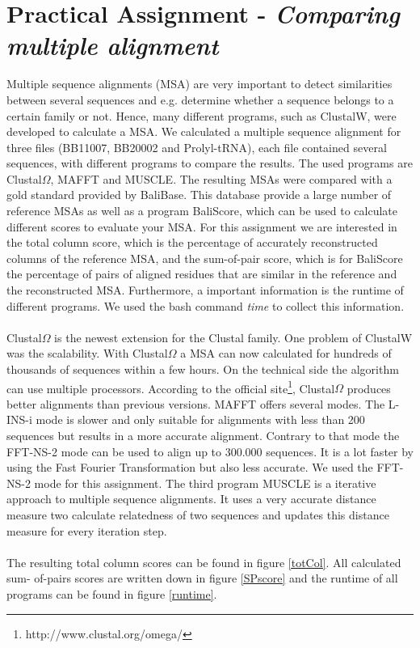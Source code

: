 \documentclass[%
   10pt,              %
   nenglish,           %
   a4paper,           %
   DIV11,             %
]{scrartcl}%
\begin{document}
\section*{Practical Assignment - \textsl{Comparing multiple alignment}}
Multiple sequence alignments (MSA) are very important to detect similarities between several 
sequences and e.g. determine whether a sequence belongs to a certain family or not. Hence, many 
different programs, such as ClustalW, were developed to calculate a MSA. We calculated a multiple 
sequence alignment for three files (BB11007, BB20002 and Prolyl-tRNA), each file contained several 
sequences, with different programs 
to compare the results. The used programs are Clustal$\Omega$\cite{Sievers539}, MAFFT\cite{Katoh1} 
and MUSCLE\cite{Edgar1, Edgar2}. The resulting MSAs were compared with a gold standard provided by 
BaliBase\cite{Bahr1}. This database provide a large number of reference MSAs as well as a program 
\grqq BaliScore\grqq , which can be used to calculate different scores to evaluate your MSA. For 
this assignment we are interested in the total column score, which is the percentage of accurately 
reconstructed columns of the reference MSA, and the sum-of-pair score, which is for BaliScore the 
percentage of pairs of aligned residues that are similar in the reference and the reconstructed 
MSA. Furthermore, a important information is the runtime of different programs. We used the bash 
command \textit{time} to collect this information.\\
\\
\noindent Clustal$\Omega$ is the newest extension for the Clustal family. One problem of ClustalW 
was the scalability. With Clustal$\Omega$ a MSA can now calculated for hundreds of thousands of 
sequences within a few hours. On the technical side the algorithm can use multiple processors. 
According to the official site\footnote{http://www.clustal.org/omega/}, Clustal$\Omega$ produces 
better alignments than previous versions. MAFFT offers several modes. The L-INS-i mode is 
slower and only suitable for alignments with less than 200 sequences but results in a more accurate 
alignment. Contrary to that mode the FFT-NS-2 mode can be used to align up to 300.000 sequences. It 
is a lot faster by using the Fast Fourier Transformation but also less accurate. We used the 
FFT-NS-2 mode for this assignment. The third program MUSCLE is a iterative approach to multiple 
sequence alignments. It uses a very accurate distance measure two calculate relatedness of two 
sequences and updates this distance measure for every iteration step.\\
\\
\noindent The resulting total column scores can be found in figure \ref{totCol}. All calculated sum-
of-pairs scores are written down in figure \ref{SPscore} and the runtime of all programs can be found 
in figure \ref{runtime}. 
\end{document}
